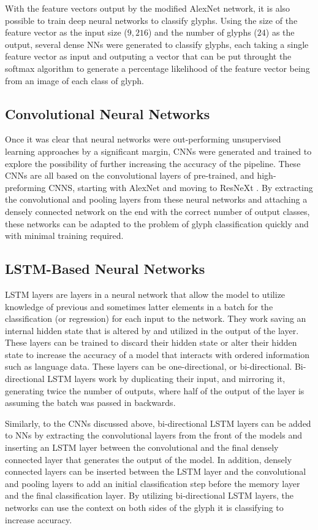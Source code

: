With the feature vectors output by the modified AlexNet network, it is also possible to train deep neural networks to classify glyphs. Using the size of the feature vector as the input size ($9,216$) and the number of glyphs ($24$) as the output, several dense NNs were generated to classify glyphs, each taking a single feature vector as input and outputing a vector that can be put throught the softmax algorithm to generate a percentage likelihood of the feature vector being from an image of each class of glyph.

\subsection{Convolutional Neural Networks}

Once it was clear that neural networks were out-performing unsupervised learning approaches by a significant margin, CNNs were generated and trained to explore the possibility of further increasing the accuracy of the pipeline. These CNNs are all based on the convolutional layers of pre-trained, and high-preforming CNNS, starting with AlexNet \cite{Krizhevsky} and moving to ResNeXt \cite{Xie}. By extracting the convolutional and pooling layers from these neural networks and attaching a densely connected network on the end with the correct number of output classes, these networks can be adapted to the problem of glyph classification quickly and with minimal training required.

\subsection{LSTM-Based Neural Networks}

LSTM layers are layers in a neural network that allow the model to utilize knowledge of previous and sometimes latter elements in a batch for the classification (or regression) for each input to the network. They work saving an internal hidden state that is altered by and utilized in the output of the layer. These layers can be trained to discard their hidden state or alter their hidden state to increase the accuracy of a model that interacts with ordered information such as language data. These layers can be one-directional, or bi-directional. Bi-directional LSTM layers work by duplicating their input, and mirroring it, generating twice the number of outputs, where half of the output of the layer is assuming the batch was passed in backwards.

Similarly, to the CNNs discussed above, bi-directional LSTM layers can be added to NNs by extracting the convolutional layers from the front of the models and inserting an LSTM layer between the convolutional and the final densely connected layer that generates the output of the model. In addition, densely connected layers can be inserted between the LSTM layer and the convolutional and pooling layers to add an initial classification step before the memory layer and the final classification layer. By utilizing bi-directional LSTM layers, the networks can use the context on both sides of the glyph it is classifying to increase accuracy.

